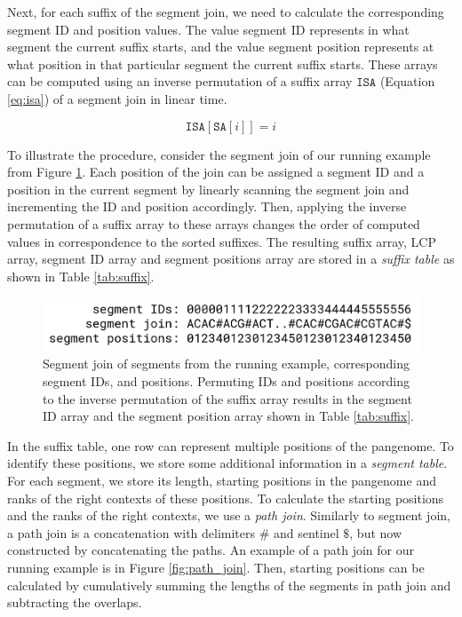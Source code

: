 Next, for each suffix of the segment join, we need to calculate the corresponding segment ID and position values.
The value segment ID represents in what segment the current suffix starts, and the value segment position represents at what position in that particular segment the current suffix starts.
These arrays can be computed using an inverse permutation of a suffix array $\texttt{ISA}$ (Equation \ref{eq:isa}) of a segment join in linear time.

\begin{equation}
    \label{eq:isa}
    \texttt{ISA}[\texttt{SA}[i]] = i
\end{equation}

To illustrate the procedure, consider the segment join of our running example from Figure \ref{fig:ids_and_positions}.
Each position of the join can be assigned a segment ID and a position in the current segment by linearly scanning the segment join and incrementing the ID and position accordingly.
Then, applying the inverse permutation of a suffix array to these arrays changes the order of computed values in correspondence to the sorted suffixes.
The resulting suffix array, LCP array, segment ID array and segment positions array are stored in a \emph{suffix table} as shown in Table \ref{tab:suffix}.

\begin{figure}
    \centering
    \includegraphics[width=\linewidth]{images/ids_and_positions.png}
    \caption{
        Segment join of segments from the running example, corresponding segment IDs, and positions.
        Permuting IDs and positions according to the inverse permutation of the suffix array results in the segment ID array and the segment position array shown in Table \ref{tab:suffix}.
    }
    \label{fig:ids_and_positions}
\end{figure}





In the suffix table, one row can represent multiple positions of the pangenome.
To identify these positions, we store some additional information in a \emph{segment table}.
For each segment, we store its length, starting positions in the pangenome and ranks of the right contexts of these positions.
To calculate the starting positions and the ranks of the right contexts, we use a \emph{path join}.
Similarly to segment join, a path join is a concatenation with delimiters $\texttt{\#}$ and sentinel $\texttt{\$}$, but now constructed by concatenating the paths.
An example of a path join for our running example is in Figure \ref{fig:path_join}.
Then, starting positions can be calculated by cumulatively summing the lengths
of the segments in path join and subtracting the overlaps.

